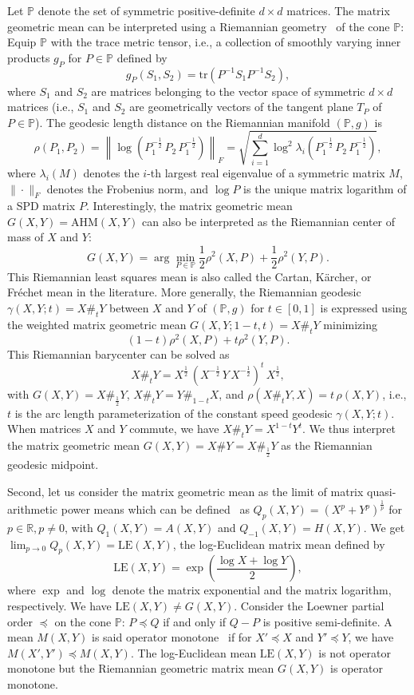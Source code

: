 \documentclass{article}
\def\bbR{\mathbb{R}}
\def\AHM{\mathrm{AHM}}
\def\tr{\mathrm{tr}}
\def\LEM{\mathrm{LE}}
\def\bbP{\mathbb{P}}
\begin{document}
Let $\bbP$ denote the set of symmetric positive-definite $d\times d$ matrices. %
The matrix geometric mean can  be interpreted using a Riemannian geometry~\cite{bhatia2006riemannian} of the cone $\bbP$:
Equip $\bbP$ with the trace metric tensor, i.e., a collection of smoothly varying inner products $g_P$ for $P\in\bbP$ defined by
$$
g_P(S_1,S_2)=\tr\left(P^{-1} S_1 P^{-1} S_2\right),
$$ 
where $S_1$ and $S_2$ are matrices belonging to the vector space of symmetric $d\times d$ matrices (i.e., $S_1$ and $S_2$ are geometrically vectors  of the tangent plane $T_P$ of $P\in\bbP$).
The geodesic length distance on the Riemannian manifold $(\bbP,g)$ is
$$
\rho(P_1,P_2)=\left\| \log\left(P_1^{-\frac{1}{2}}\, P_2\, P_1^{-\frac{1}{2}}\right)\right\|_F  =\sqrt{\sum_{i=1}^d \log^2 \lambda_i\left(P_1^{-\frac{1}{2}}\, P_2\, P_1^{-\frac{1}{2}}\right)},
$$
where $\lambda_i(M)$ denotes the $i$-th largest real eigenvalue of a symmetric matrix $M$, $\|\cdot\|_F$ denotes the Frobenius norm, and $\log P$ is the unique matrix logarithm of a SPD matrix $P$.
Interestingly, the matrix geometric mean $G(X,Y)=\AHM(X,Y)$ can also  be interpreted as the Riemannian center of mass of $X$ and $Y$:
$$
G(X,Y)=\arg\min_{P\in\bbP} \frac{1}{2}\rho^2(X,P)+\frac{1}{2}\rho^2(Y,P).
$$
This  Riemannian least squares mean is also called the Cartan, K\"archer, or Fr\'echet mean in the literature.
More generally, the Riemannian geodesic $\gamma(X,Y;t)=X\#_t Y$ between $X$ and $Y$ of $(\bbP,g)$ for $t\in [0,1]$ is expressed using the weighted matrix geometric mean {$G(X,Y;1-t,t)=X\#_t Y$} minimizing
$$
(1-t) \rho^2(X,P)+t\rho^2(Y,P).
$$
This Riemannian barycenter can be solved as
$$
X\#_t Y= 
X^{\frac{1}{2}}\, \left(X^{-\frac{1}{2}}\, Y\, X^{-\frac{1}{2}}\right)^t\, X^{\frac{1}{2}},
$$
with $G(X,Y)=X\#_{\frac{1}{2}} Y$, $X\#_t Y=Y\#_{1-t} X$, and $\rho(X\#_t Y,X)=t\, \rho(X,Y)$, i.e., $t$ is the arc length parameterization of the constant speed geodesic $\gamma(X,Y;t)$. When matrices $X$ and $Y$ commute, we have $X\#_t Y=X^{1-t}Y^t$.
We thus interpret the matrix geometric mean $G(X,Y)=X\#Y=X\#_{\frac{1}{2}} Y$ as the Riemannian geodesic midpoint.

 


Second, let us consider the matrix geometric mean as the limit of  matrix quasi-arithmetic power means which can be  defined~\cite{lim2012matrix} as $Q_p(X,Y)=(X^p+Y^p)^{\frac{1}{p}}$ for $p\in\bbR, p\not=0$, with 
$Q_1(X,Y)=A(X,Y)$ and $Q_{-1}(X,Y)=H(X,Y)$.
We get $\lim_{p\rightarrow 0} Q_p(X,Y)=\LEM(X,Y)$, the log-Euclidean matrix mean defined by
$$
\LEM(X,Y)=\exp\left(\frac{\log X+\log Y}{2}\right),
$$
where $\exp$ and $\log$ denote the matrix exponential and  the matrix logarithm, respectively.
We have $\LEM(X,Y)\not =G(X,Y)$.
Consider the Loewner partial order $\preceq$ on the cone $\bbP$:
 $P\preceq Q$ if and only if $Q-P$ is positive semi-definite.
A mean $M(X,Y)$ is said operator monotone~\cite{bhatia2006riemannian} if for $X'\preceq X$ and $Y'\preceq Y$, we have
$M(X',Y')\preceq M(X,Y)$. 
The log-Euclidean mean $\LEM(X,Y)$ is not operator monotone but the Riemannian geometric matrix mean $G(X,Y)$ is operator monotone.
\end{document}
